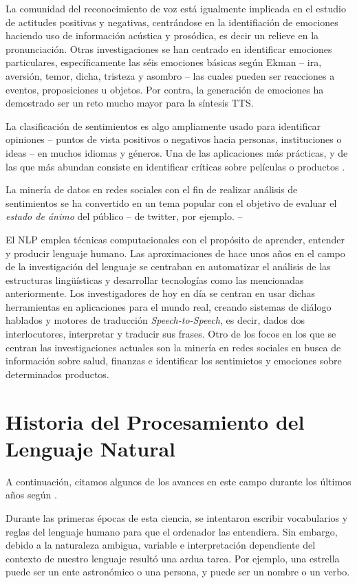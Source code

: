 La comunidad del reconocimiento de voz está igualmente implicada en el estudio
de actitudes positivas y negativas, centrándose en la identifiación de emociones
haciendo uso de información acústica y prosódica, es decir un relieve en la
pronunciación. Otras investigaciones se han centrado en identificar emociones
particulares, específicamente las séis emociones básicas según Ekman -- ira,
aversión, temor, dicha, tristeza y asombro -- las cuales pueden ser reacciones a
eventos, proposiciones u objetos. Por contra, la generación de emociones ha
demostrado ser un reto mucho mayor para la síntesis \ac{TTS}.

La clasificación de sentimientos es algo ampliamente usado para identificar
opiniones -- puntos de vista positivos o negativos hacia personas, instituciones
o ideas -- en muchos idiomas y géneros. Una de las aplicaciones más prácticas, y
de las que más abundan consiste en identificar críticas sobre películas o
productos \cite{Pang2002,Wang2014}.

La minería de datos en redes sociales con el fin de realizar análisis de
sentimientos se ha convertido en un tema popular con el objetivo de evaluar el
\emph{estado de ánimo} del público -- de twitter, por ejemplo. -- 

El \ac{NLP} emplea técnicas computacionales con el propósito de aprender,
entender y producir lenguaje humano. Las aproximaciones de hace unos años en el
campo de la investigación del lenguaje se centraban en automatizar el análisis
de las estructuras lingüísticas y desarrollar tecnologías como las mencionadas
anteriormente. Los investigadores de hoy en día se centran en usar dichas
herramientas en aplicaciones para el mundo real, creando sistemas de diálogo
hablados y motores de traducción \emph{Speech-to-Speech}, es decir, dados dos
interlocutores, interpretar y traducir sus frases. Otro de los focos en los que
se centran las investigaciones actuales son la minería en redes sociales en
busca de información sobre salud, finanzas e identificar los sentimietos y
emociones sobre determinados productos.

\section{Historia del Procesamiento del Lenguaje Natural}
\label{sec:currentnlp}

A continuación, citamos algunos de los avances en este campo durante los últimos
años según \citet{Hirschberg2015}.

Durante las primeras épocas de esta ciencia, se intentaron escribir vocabularios
y reglas del lenguaje humano para que el ordenador las entendiera. Sin embargo,
debido a la naturaleza ambigua, variable e interpretación dependiente del
contexto de nuestro lenguaje resultó una ardua tarea. Por ejemplo, una estrella
puede ser un ente astronómico o una persona, y puede ser un nombre o un verbo.


